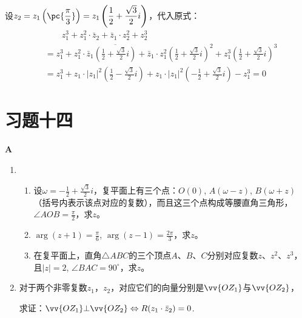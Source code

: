 \begin{solution}
设$z_2=z_1\left(\pc{\frac{\pi}{3}}\right)=z_1\left(\frac{1}{2}+\frac{\sqrt{3}}{2}i\right)$，代入原式：
\[\begin{split}
    &\qquad z^3_1+z^2_1\cdot \bar z_2+\bar z_1\cdot z^2_2+z^3_2\\
    &=z^3_1+z^2_1\cdot \bar z_1\overline{\left(\frac{1}{2}+\frac{\sqrt{3}}{2}i\right)}+\bar z_1\cdot z^2_1\left(\frac{1}{2}+\frac{\sqrt{3}}{2}i\right)^2+z^3_1\left(\frac{1}{2}+\frac{\sqrt{3}}{2}i\right)^3\\
    &=z^3_1+z_1\cdot |z_1|^2\left(\frac{1}{2}-\frac{\sqrt{3}}{2}i\right)+z_1\cdot |z_1|^2\left(-\frac{1}{2}+\frac{\sqrt{3}}{2}i\right)-z^3_1=0
\end{split}\]
\end{solution}

\section*{习题十四}
\begin{center}
    \bfseries A
\end{center}
\begin{enumerate}
    \item \begin{enumerate}[(1)]
    \item 设$\omega=-\frac{1}{2}+\frac{\sqrt{3}}{2}i$，复平面上有三个点：$O(0)$,
    $A(\omega-z)$, $B(\omega+z)$（括号内表示该点对应的复数），而且这三个点构成等腰直角三角形，$\angle AOB=\frac{\pi}{2}$，求$z$。
    \item $\arg(z+1)=\frac{\pi}{6}$, $\arg(z-1)=\frac{2\pi}{3}$，求$z$。
    \item 在复平面上，直角$\triangle ABC$的三个顶点$A$、$B$、$C$分别对应复数$z$、$z^2$、$z^3$，且$|z|=2$, $\angle BAC=90^{\circ}$，求$z$。
    \end{enumerate}

    \item 对于两个非零复数$z_1$，$z_2$，对应它们的向量分别是$\vv{OZ_1}$与$\vv{OZ_2}$，
    
    求证：$\vv{OZ_1}\bot\vv{OZ_2}\Leftrightarrow R(z_1\cdot \bar z_2)=0$.
\end{enumerate}
    
